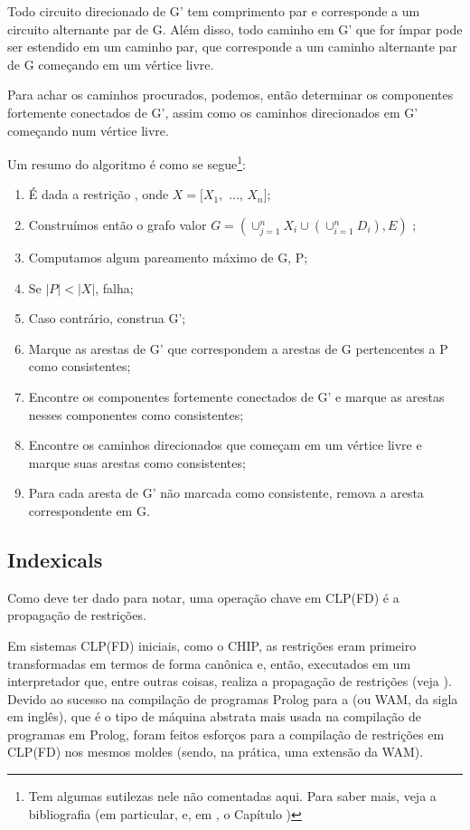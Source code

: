 \begin{theorem}
  Todo circuito direcionado de G' tem comprimento par e corresponde a um circuito alternante par de G. Além disso, todo caminho em G' que for ímpar pode ser estendido em um caminho par, que corresponde a um caminho alternante par de G começando em um vértice livre.
\end{theorem}

Para achar os caminhos procurados, podemos, então determinar os componentes fortemente conectados de G', assim como os caminhos direcionados em G' começando num vértice livre.

Um resumo do algoritmo é como se segue\footnote{Tem algumas sutilezas nele não comentadas aqui. Para
  saber mais, veja a bibliografia (em particular, \cite{basileos} e, em \cite{cristo}, o Capítulo
  )}:

\begin{enumerate}
  \item É dada a restrição , onde $X = [X_1,$ ..., $X_n]$;
  \item Construímos então o grafo valor $G = (\cup_{j=1}^nX_i\cup(\cup_{i=1}^nD_i),E)$  ;
  \item Computamos algum pareamento máximo de G, P;
  \item Se $|P| < |X|$, falha;
  \item Caso contrário, construa G';
  \item Marque as arestas de G' que correspondem a arestas de G pertencentes a P como consistentes;
  \item Encontre os componentes fortemente conectados de G' e marque as arestas nesses componentes como consistentes;
  \item Encontre os caminhos direcionados que começam em um vértice livre e marque suas arestas como consistentes;
  \item Para cada aresta de G' não marcada como consistente, remova a aresta correspondente em G.
\end{enumerate}



\subsection{Indexicals}

Como deve ter dado para notar, uma operação chave em CLP(FD) é a propagação de restrições.

Em sistemas CLP(FD) iniciais, como o CHIP, as restrições eram primeiro transformadas em termos de forma canônica
e, então, executados em um interpretador que, entre outras coisas, realiza a propagação de restrições (veja \cite{zhou}).
Devido ao sucesso na compilação de programas Prolog para a  (ou WAM, da sigla em inglês),
que é o tipo de máquina abstrata mais usada na compilação de programas em Prolog, foram feitos esforços para a compilação
de restrições em CLP(FD) nos mesmos moldes (sendo, na prática, uma extensão da WAM).

